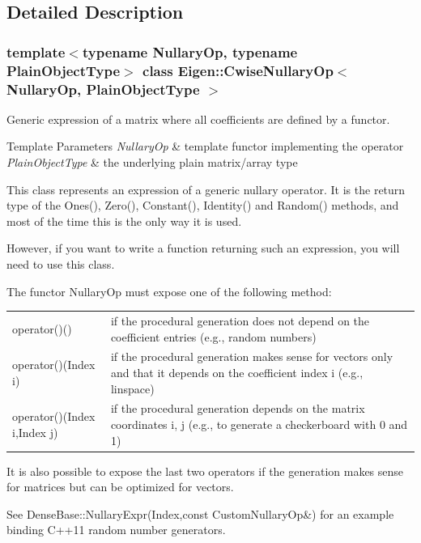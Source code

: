 \subsection{Detailed Description}
\subsubsection*{template$<$typename Nullary\+Op, typename Plain\+Object\+Type$>$\newline
class Eigen\+::\+Cwise\+Nullary\+Op$<$ Nullary\+Op, Plain\+Object\+Type $>$}

Generic expression of a matrix where all coefficients are defined by a functor. 


\begin{DoxyTemplParams}{Template Parameters}
{\em Nullary\+Op} & template functor implementing the operator \\
\hline
{\em Plain\+Object\+Type} & the underlying plain matrix/array type\\
\hline
\end{DoxyTemplParams}
This class represents an expression of a generic nullary operator. It is the return type of the Ones(), Zero(), Constant(), Identity() and Random() methods, and most of the time this is the only way it is used.

However, if you want to write a function returning such an expression, you will need to use this class.

The functor Nullary\+Op must expose one of the following method\+: \tabulinesep=1mm
\begin{longtabu}spread 0pt [c]{*{2}{|X[-1]}|}
\hline
{\ttfamily operator()()} &if the procedural generation does not depend on the coefficient entries (e.\+g., random numbers) \\
{\ttfamily operator()(\+Index i)} &if the procedural generation makes sense for vectors only and that it depends on the coefficient index {\ttfamily i} (e.\+g., linspace)  \\
{\ttfamily operator()(\+Index i,\+Index j)} &if the procedural generation depends on the matrix coordinates {\ttfamily i}, {\ttfamily j} (e.\+g., to generate a checkerboard with 0 and 1) \\
\end{longtabu}
It is also possible to expose the last two operators if the generation makes sense for matrices but can be optimized for vectors.

See Dense\+Base\+::\+Nullary\+Expr(\+Index,const Custom\+Nullary\+Op\&) for an example binding C++11 random number generators.


